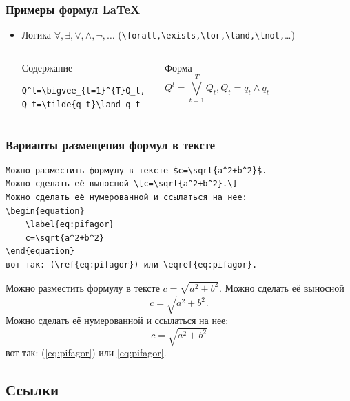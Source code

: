 \begin{frame}[fragile]
\frametitle{Примеры формул \LaTeX}
\begin{itemize}

\item Логика $\forall,\exists,\lor,\land,\lnot,\ldots$ (\verb"\forall,\exists,\lor,\land,\lnot,"\ldots)
    \begin{columns}
            \begin{block}{Содержание}
\begin{verbatim}
Q^l=\bigvee_{t=1}^{T}Q_t, 
Q_t=\tilde{q_t}\land q_t
\end{verbatim}
            \end{block}
        
            \begin{block}{Форма}
            \[Q^l=\bigvee_{t=1}^{T}Q_t, Q_t=\tilde{q_t}\land q_t\]
            \end{block}
    \end{columns}
\end{itemize}
\end{frame}


\begin{frame}
\frametitle{Варианты размещения формул в тексте}
\begin{example}[Содержание]
\begin{verbatim}
Можно разместить формулу в тексте $c=\sqrt{a^2+b^2}$. 
Можно сделать её выносной \[c=\sqrt{a^2+b^2}.\] 
Можно сделать её нумерованной и ссылаться на нее:
\begin{equation}
    \label{eq:pifagor}
    c=\sqrt{a^2+b^2}
\end{equation}
вот так: (\ref{eq:pifagor}) или \eqref{eq:pifagor}.
\end{verbatim}
\end{example}

\begin{example}[Форма]
Можно разместить формулу в тексте $c=\sqrt{a^2+b^2}$. 
Можно сделать её выносной \[c=\sqrt{a^2+b^2}.\] 
Можно сделать её нумерованной и ссылаться на нее:
\begin{equation}\label{eq:pifagor}
c=\sqrt{a^2+b^2}\end{equation}
вот так: (\ref{eq:pifagor}) или \eqref{eq:pifagor}.
\end{example}

\end{frame}


\subsection{Ссылки}


